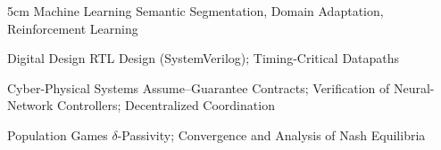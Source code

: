 


\begin{cvsides}{5cm}
  \cvside
    {Machine Learning}
      {Semantic Segmentation, Domain Adaptation, Reinforcement Learning}

\cvside
  {Digital Design}
  {RTL Design (SystemVerilog); Timing-Critical Datapaths}

\cvside
  {Cyber-Physical Systems}
  {Assume–Guarantee Contracts; Verification of Neural-Network Controllers; Decentralized Coordination}

\cvside
  {Population Games}
  {$\delta$-Passivity; Convergence and Analysis of Nash Equilibria}
\end{cvsides}
